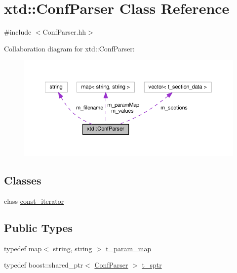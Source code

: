 \hypertarget{classxtd_1_1ConfParser}{}\section{xtd\+:\+:Conf\+Parser Class Reference}
\label{classxtd_1_1ConfParser}


{\ttfamily \#include $<$Conf\+Parser.\+hh$>$}



Collaboration diagram for xtd\+:\+:Conf\+Parser\+:
\nopagebreak
\begin{figure}[H]
\begin{center}
\leavevmode
\includegraphics[width=350pt]{classxtd_1_1ConfParser__coll__graph}
\end{center}
\end{figure}
\subsection*{Classes}
\begin{DoxyCompactItemize}
\item 
class \hyperlink{classxtd_1_1ConfParser_1_1const__iterator}{const\+\_\+iterator}
\end{DoxyCompactItemize}
\subsection*{Public Types}
\begin{DoxyCompactItemize}
\item 
typedef map$<$ string, string $>$ \hyperlink{classxtd_1_1ConfParser_a715a3e39fd796046c94546e60f22414d}{t\+\_\+param\+\_\+map}
\item 
typedef boost\+::shared\+\_\+ptr$<$ \hyperlink{classxtd_1_1ConfParser}{Conf\+Parser} $>$ \hyperlink{classxtd_1_1ConfParser_ae1e724e304256650bac2e9b2d63a51df}{t\+\_\+sptr}
\end{DoxyCompactItemize}
